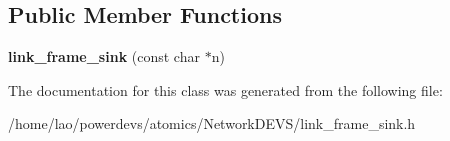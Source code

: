 \subsection*{Public Member Functions}
\begin{DoxyCompactItemize}
\item 
{\bfseries link\+\_\+frame\+\_\+sink} (const char $\ast$n)\hypertarget{classlink__frame__sink_a34ab220d2e602bf129b3ca2ca893f00f}{}\label{classlink__frame__sink_a34ab220d2e602bf129b3ca2ca893f00f}

\end{DoxyCompactItemize}


The documentation for this class was generated from the following file\+:\begin{DoxyCompactItemize}
\item 
/home/lao/powerdevs/atomics/\+Network\+D\+E\+V\+S/link\+\_\+frame\+\_\+sink.\+h\end{DoxyCompactItemize}
